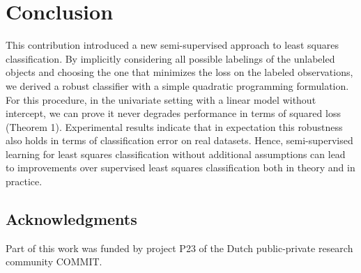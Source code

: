 \documentclass{llncs}
\begin{document}


\section{Conclusion}
This contribution introduced a new semi-supervised approach to least squares classification. By implicitly considering all possible labelings of the unlabeled objects and choosing the one that minimizes the loss on the labeled observations, we derived a robust classifier with a simple quadratic programming formulation. For this procedure, in the univariate setting with a linear model without intercept, we can prove it never degrades performance in terms of squared loss (Theorem 1). Experimental results indicate that in expectation this robustness also holds in terms of classification error on real datasets. Hence, semi-supervised learning for least squares classification without additional assumptions can lead to improvements over supervised least squares classification both in theory and in practice.

\subsection*{Acknowledgments}\label{sec:Acknowledgments}
Part of this work was funded by project P23 of the Dutch public-private research community COMMIT.



\end{document}
